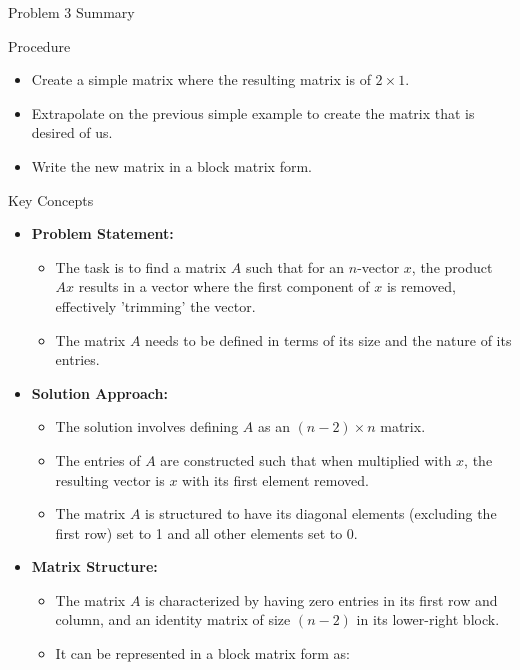 \begin{summary}{Problem 3 Summary}
    \begin{statement}{Procedure}
        \begin{itemize}
            \item Create a simple matrix where the resulting matrix is of $2 \times 1$.
            \item Extrapolate on the previous simple example to create the matrix that is desired of us.
            \item Write the new matrix in a block matrix form.
        \end{itemize}
    \end{statement}
    \begin{statement}{Key Concepts}
        \begin{itemize}
            \item \textbf{Problem Statement:}
            \begin{itemize}
                \item The task is to find a matrix $A$ such that for an $n$-vector $x$, the product $Ax$ results in a vector where the first component of $x$ is removed, 
                effectively 'trimming' the vector.
                \item The matrix $A$ needs to be defined in terms of its size and the nature of its entries.
            \end{itemize}
            \item \textbf{Solution Approach:}
            \begin{itemize}
                \item The solution involves defining $A$ as an $(n-2) \times n$ matrix.
                \item The entries of $A$ are constructed such that when multiplied with $x$, the resulting vector is $x$ with its first element removed.
                \item The matrix $A$ is structured to have its diagonal elements (excluding the first row) set to 1 and all other elements set to 0.
            \end{itemize}
            \item \textbf{Matrix Structure:}
            \begin{itemize}
                \item The matrix $A$ is characterized by having zero entries in its first row and column, and an identity matrix of size $(n-2)$ in its lower-right block.
                \item It can be represented in a block matrix form as:

\end{itemize}
\end{itemize}
\end{statement}
\end{summary}
